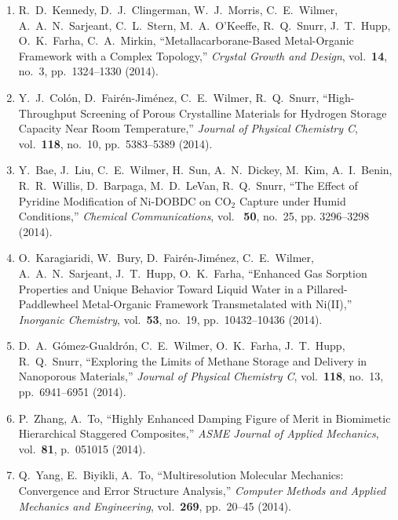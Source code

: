 \begin{enumerate}

\item R.\ D.\ Kennedy, D.\ J.\ Clingerman, W.\ J.\ Morris, C.\ E.\ Wilmer,
  A.\ A.\ N.\ Sarjeant, C.\ L.\ Stern, M.\ A.\ O'Keeffe, R.\ Q.\ Snurr,
  J.\ T.\ Hupp, O.\ K.\ Farha, C.\ A.\ Mirkin, ``Metallacarborane-Based
  Metal-Organic Framework with a Complex Topology,'' \textit{Crystal Growth and Design}, vol.\ \textbf{14}, no.\ 3, pp.\ 1324--1330 (2014).

\item Y.\ J.\ Col\'{o}n, D.\ Fair\'{e}n-Jim\'{e}nez, C.\ E.\ Wilmer,
  R.\ Q.\ Snurr, ``High-Throughput Screening of Porous Crystalline Materials for Hydrogen Storage Capacity Near Room Temperature,'' \textit{Journal of Physical Chemistry C}, vol.\ \textbf{118}, no.\ 10, pp.\ 5383--5389 (2014).
  
\item Y.\ Bae, J.\ Liu, C.\ E.\ Wilmer, H.\ Sun, A.\ N.\ Dickey, M.\ Kim,
  A.\ I.\ Benin, R.\ R.\ Willis, D.\ Barpaga, M.\ D.\ LeVan, R.\ Q.\ Snurr, ``The Effect of Pyridine Modification of Ni-DOBDC on $\mathrm{CO}_2$ Capture under Humid Conditions,'' \textit{Chemical Communications}, vol. \ \textbf{50}, no.\ 25, pp. 3296--3298 (2014).
  
\item O.\ Karagiaridi, W.\ Bury, D.\ Fair\'{e}n-Jim\'{e}nez, C.\ E.\ Wilmer, A.\ A.\ N.\ Sarjeant, J.\ T.\ Hupp, O.\ K.\ Farha, ``Enhanced Gas Sorption Properties and Unique Behavior Toward Liquid Water in a Pillared-Paddlewheel Metal-Organic Framework Transmetalated with Ni(II),'' \textit{Inorganic Chemistry}, vol.\ \textbf{53}, no.\ 19, pp.\ 10432--10436 (2014).

\item D.\ A.\ G\'{o}mez-Gualdr\'{o}n, C.\ E.\ Wilmer, O.\ K.\ Farha,   J.\ T.\ Hupp, R.\ Q.\ Snurr, ``Exploring the Limits of Methane Storage and   Delivery in Nanoporous Materials,'' \textit{Journal of Physical Chemistry C}, vol.\ \textbf{118}, no.\ 13, pp.\ 6941--6951 (2014).

\item P.\ Zhang, A.\ To, ``Highly Enhanced Damping Figure of Merit in Biomimetic Hierarchical Staggered Composites,'' \textit{ASME Journal of Applied Mechanics}, vol.\ \textbf{81}, p.\ 051015 (2014).

\item Q.\ Yang, E.\ Biyikli, A.\ To, ``Multiresolution Molecular Mechanics: Convergence and Error Structure Analysis,'' \textit{Computer Methods and Applied Mechanics and Engineering}, vol.\ \textbf{269}, pp.\ 20--45 (2014).


\end{enumerate}
